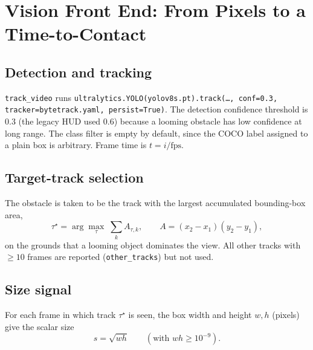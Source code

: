 \documentclass[11pt,a4paper]{article}
\newcommand{\code}[1]{\texttt{\small #1}}
\begin{document}
\section{Vision Front End: From Pixels to a Time-to-Contact}
\subsection{Detection and tracking}
\code{track\_video} runs \code{ultralytics.YOLO(yolov8s.pt).track(\dots, conf=0.3, tracker=bytetrack.yaml, persist=True)}.
The detection confidence threshold is $0.3$ (the legacy HUD used $0.6$) because a looming obstacle has low confidence at long range.
The class filter is empty by default, since the COCO label assigned to a plain box is arbitrary. Frame time is $t=i/\text{fps}$.

\subsection{Target-track selection}
The obstacle is taken to be the track with the largest accumulated bounding-box area,
\begin{equation}
\tau^\star=\arg\max_{\tau}\;\sum_{k}A_{\tau,k},\qquad A=(x_2-x_1)(y_2-y_1),
\end{equation}
on the grounds that a looming object dominates the view. All other tracks with $\ge10$ frames are reported (\code{other\_tracks}) but not used.

\subsection{Size signal}
For each frame in which track $\tau^\star$ is seen, the box width and height $w,h$ (pixels) give the scalar size
\begin{equation}
s=\sqrt{wh}\qquad(\text{with }wh\ge10^{-9}).
\end{equation}
\end{document}
